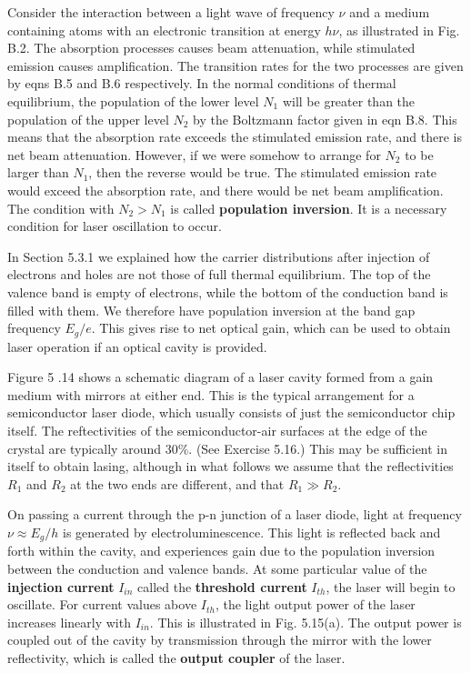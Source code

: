 \documentclass[12pt]{book}
\begin{document}
Consider the interaction between a light wave of frequency $\nu$ and a medium containing atoms with an electronic transition at energy $h\nu$, as illustrated in Fig. B.2. The absorption processes causes beam attenuation, while stimulated emission causes amplification. The transition rates for the two processes are given by eqns B.5 and B.6 respectively. In the normal conditions of thermal equilibrium, the population of the lower level $N_1$ will be greater than the population of the upper level $N_2$ by the Boltzmann factor given in eqn B.8. This means that the absorption rate exceeds the stimulated emission rate, and there is net beam attenuation. However, if we were somehow to arrange for $N_2$ to be larger than $N_1$, then the reverse would be true. The stimulated emission rate would exceed the absorption rate, and there would be net beam amplification. The condition with $N_2 > N_1$ is called \textbf{population inversion}. It is a necessary condition for laser oscillation to occur.

In Section 5.3.1 we explained how the carrier distributions after injection of electrons and holes are not those of full thermal equilibrium. The top of the valence band is empty of electrons, while the bottom of the conduction band is filled with them. We therefore have population inversion at the band gap frequency $E_g/e$. This gives rise to net optical gain, which can be used to obtain laser operation if an optical cavity is provided.

Figure 5 .14 shows a schematic diagram of a laser cavity formed from a gain medium with mirrors at either end. This is the typical arrangement for a semiconductor laser diode, which usually consists of just the semiconductor chip itself. The reftectivities of the semiconductor-air surfaces at the edge of the crystal are typically around $30 \%$. (See Exercise 5.16.) This may be sufficient in itself to obtain lasing, although in what follows we assume that the reflectivities $R_1$ and $R_2$ at the two ends are different, and that $R_1\gg R_2$.

On passing a current through the p-n junction of a laser diode, light at frequency $\nu\approx E_g/h$ is generated by electroluminescence. This light is reflected back and forth within the cavity, and experiences gain due to the population inversion between the conduction and valence bands. At some particular value of the \textbf{injection current} $I_{in}$ called the \textbf{threshold current} $I_{th}$, the laser will begin to oscillate. For current values above $I_{th}$, the light output power of the laser increases linearly with $I_{in}$. This is illustrated in Fig. 5.15(a). The output power is coupled out of the cavity by transmission through the mirror with the lower reflectivity, which is called the \textbf{output coupler} of the laser.
\end{document}

